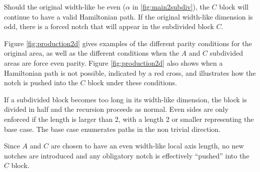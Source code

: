 Should the original width-like be even ($\alpha$ in \ref{fig:main2subdiv}), the $C$ block will continue to have 
a valid Hamiltonian path.
If the original width-like dimension is odd, there is a forced notch that will appear in the subdivided block $C$.

Figure \ref{fig:production2d} gives examples of the different parity conditions for the original area,
as well as the different conditions when the $A$ and $C$ subdivided areas are force even parity.
Figure \ref{fig:production2d} also shows when a Hamiltonian
path is not possible, indicated by a red cross, and illustrates how the notch is pushed into the $C$ block
under these conditions.

If a subdivided block becomes too long in its width-like dimension, the block is divided in half and the recursion
proceeds as normal.
Even sides are only enforced if the length is larger than 2, with a length 2 or smaller representing the base
case.
The base case enumerates paths in the non trivial direction.

Since $A$ and $C$ are chosen to have an even width-like local axis length, no new notches are introduced and any
obligatory notch is effectively ``pushed'' into the $C$ block.





